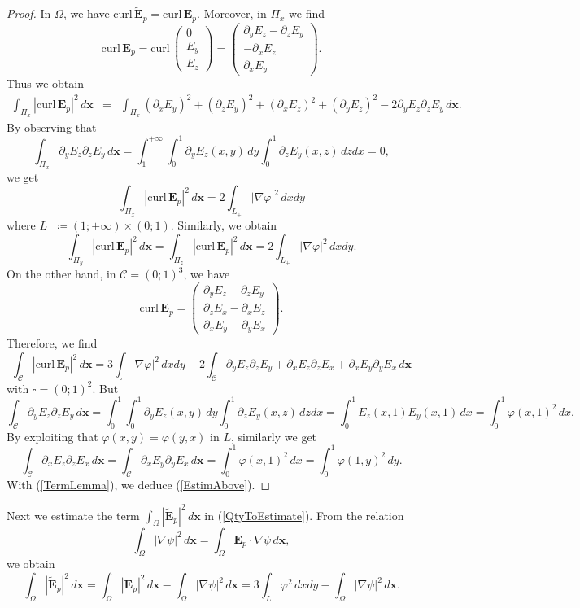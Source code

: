 \documentclass[11pt,a4paper]{article}
\newcommand{\dsp}{\displaystyle}
\newcommand{\Om}{\Omega}
\newcommand{\mrm}[1]{\mathrm{#1}}
\newcommand{\bfx}{\boldsymbol{x}}
\newcommand{\curlvec}{\boldsymbol{\mrm{curl}}\,}
\newcommand{\GL}{L}
\def\E{\boldsymbol{E}}
\begin{document}
\begin{proof}
In $\Om$, we have $\curlvec \tilde{\E}_p=\curlvec \E_p$. Moreover, in $\Pi_x$ we find
\[
\curlvec \E_p=\curlvec \left(\begin{array}{c}
0\\
E_y\\
E_z
\end{array}\right)=\left(\begin{array}{c}
\partial_yE_z-\partial_zE_y\\
-\partial_xE_z\\
\partial_xE_y
\end{array}\right).
\]
Thus we obtain
\[
\begin{array}{rcl}
\dsp\int_{\Pi_x}|\curlvec \E_p|^2\,d\bfx&=&\dsp\int_{\Pi_x}(\partial_xE_y)^2+(\partial_zE_y)^2+(\partial_xE_z)^2+(\partial_yE_z)^2-2\partial_yE_z\partial_zE_y\,d\bfx.
\end{array}
\]
By observing that 
\[
\dsp\int_{\Pi_x}\partial_yE_z\partial_zE_y\,d\bfx=\int_1^{+\infty}\int_0^1 \partial_yE_z(x,y)\,dy\int_0^1\partial_zE_y(x,z)\,dzdx=0,
\]
we get 
\[
\dsp\int_{\Pi_x}|\curlvec \E_p|^2\,d\bfx=2\int_{\GL_+}|
\nabla\varphi|^2\,dxdy
\]
where $\GL_+\coloneqq(1;+\infty)\times(0;1)$. Similarly, we obtain
\[
\dsp\int_{\Pi_y}|\curlvec \E_p|^2\,d\bfx=\dsp\int_{\Pi_z}|\curlvec \E_p|^2\,d\bfx=2\int_{\GL_+}|
\nabla\varphi|^2\,dxdy.
\]
On the other hand, in $\mathcal{C}=(0;1)^3$, we have
\[
\curlvec \E_p=\left(\begin{array}{c}
\partial_yE_z-\partial_zE_y\\
\partial_zE_x-\partial_xE_z\\
\partial_xE_y-\partial_yE_x
\end{array}\right).
\]
Therefore, we find
\begin{equation}\label{TermLemma}
\dsp\int_{\mathcal{C}}|\curlvec \E_p|^2\,d\bfx=3\int_{\square}|
\nabla\varphi|^2\,dxdy-2\dsp\int_{\mathcal{C}} \partial_yE_z\partial_zE_y+\partial_xE_z\partial_zE_x+\partial_xE_y\partial_yE_x\,d\bfx
\end{equation}
with $\square=(0;1)^2$. But 
\[
\dsp\int_{\mathcal{C}} \partial_yE_z\partial_zE_y\,d\bfx=\int_0^{1}\int_0^1 \partial_yE_z(x,y)\,dy\int_0^1\partial_zE_y(x,z)\,dzdx=\int_0^{1}E_z(x,1)E_y(x,1)\,dx=\int_0^1\varphi(x,1)^2\,dx.
\]
By exploiting that $\varphi(x,y)=\varphi(y,x)$ in $\GL$, similarly we get
\[
\dsp\int_{\mathcal{C}} \partial_xE_z\partial_zE_x\,d\bfx=\dsp\int_{\mathcal{C}} \partial_xE_y\partial_yE_x\,d\bfx=\int_0^1\varphi(x,1)^2\,dx=\int_0^1\varphi(1,y)^2\,dy.
\]
With (\ref{TermLemma}), we deduce (\ref{EstimAbove}).
\end{proof}
\noindent Next we estimate the term $\int_{\Om} |\tilde{\E}_{p}|^2\,d\bfx$ in  (\ref{QtyToEstimate}). From the relation
\begin{equation}\label{TermNRJBis}
\int_{\Om}|\nabla\psi|^2\,d\bfx=\int_{\Om}\E_p\cdot\nabla\psi\,d\bfx,
\end{equation}
we obtain
\begin{equation}\label{Rel2}
\int_{\Om} |\tilde{\E}_{p}|^2\,d\bfx=\int_{\Om} |\E_{p}|^2\,d\bfx-\int_{\Om} |\nabla\psi|^2\,d\bfx =3\dsp\int_\GL\varphi^2\,dxdy-\int_{\Om} |\nabla\psi|^2\,d\bfx.
\end{equation}
\end{document}
